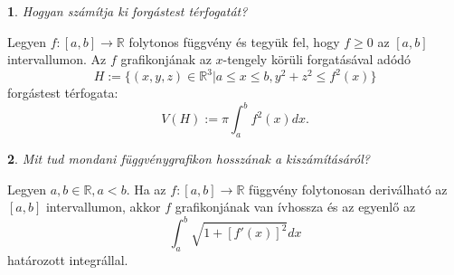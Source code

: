 \documentclass[a4paper]{article}
\def\R{\mathbb{R}}
\theoremstyle{qstyle}
\newtheorem{question}{}{}
\begin{document}
	\begin{question}
		Hogyan számítja ki forgástest térfogatát?
	\end{question}
	Legyen $f : [a,b] \to \R$ folytonos függvény és tegyük fel, hogy $f \ge 0$  az $[a,b]$ intervallumon. Az $f$ grafikonjának az $x$-tengely körüli forgatásával adódó
	$$H:= \{(x,y,z)\in\R^3 | a\le x\le b, y^2+z^2 \le f^2(x)  \}$$
	forgástest térfogata:
	$$V(H):= \pi \int_{a}^{b} f^2(x)dx\text{.}$$
	
	\begin{question}
		Mit tud mondani függvénygrafikon hosszának a kiszámításáról?
	\end{question}
	Legyen $a,b \in \R, a<b$. Ha az $f:[a,b] \to \R$ függvény folytonosan deriválható az $[a,b]$ intervallumon, akkor $f$ grafikonjának van ívhossza és az egyenlő az
	$$\int_{a}^{b}\sqrt{1+[f'(x)]^2} dx$$
	határozott integrállal.
	
\end{document}
